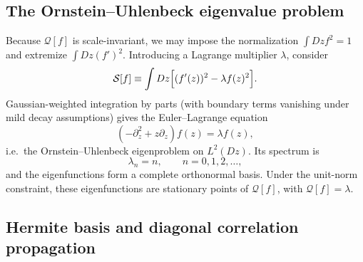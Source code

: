\documentclass{article}
\theoremstyle{plain}
\theoremstyle{definition}
\theoremstyle{remark}
\begin{document}
\subsection{The Ornstein--Uhlenbeck eigenvalue problem}
\label{sec:ou}

Because $\mathcal{Q}[f]$ is scale-invariant, we may impose the normalization $\int Dz f^2 = 1$ and extremize $\int Dz (f')^2$. Introducing a Lagrange multiplier $\lambda$, consider
\relax
\begin{equation}
\mathcal{S}[f] \equiv \int Dz \Bigl[(f'(z))^2 - \lambda f(z)^2\Bigr].
\end{equation}
\relax
Gaussian-weighted integration by parts (with boundary terms vanishing under mild decay assumptions) gives the Euler--Lagrange equation
\relax
\begin{equation}
\left(-\partial_z^2 + z \partial_z\right)f(z) = \lambda f(z),
\label{eq:OU-eigenvalue}
\end{equation}
\relax
i.e.\ the Ornstein--Uhlenbeck eigenproblem on $L^2(Dz)$. Its spectrum is
\relax
\begin{equation}
\lambda_n = n, \qquad n=0,1,2,\dots,
\end{equation}
\relax
and the eigenfunctions form a complete orthonormal basis. Under the unit-norm constraint, these eigenfunctions are stationary points of $\mathcal{Q}[f]$, with $\mathcal{Q}[f]=\lambda$.










\subsection{Hermite basis and diagonal correlation propagation}
\label{sec:hermite}
\end{document}
